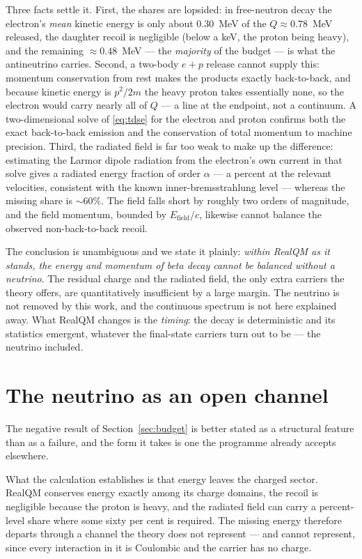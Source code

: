 \documentclass[11pt]{article}
\begin{document}
Three facts settle it. First, the shares are lopsided: in free-neutron decay the electron's \emph{mean}
kinetic energy is only about $0.30$~MeV of the $Q\approx0.78$~MeV released, the daughter recoil is
negligible (below a keV, the proton being heavy), and the remaining $\approx0.48$~MeV --- the
\emph{majority} of the budget --- is what the antineutrino carries. Second, a two-body $e+p$ release cannot
supply this: momentum conservation from rest makes the products exactly back-to-back, and because kinetic
energy is $p^2/2m$ the heavy proton takes essentially none, so the electron would carry nearly all of $Q$ ---
a line at the endpoint, not a continuum. A two-dimensional solve of \eqref{eq:tdse} for the electron and
proton confirms both the exact back-to-back emission and the conservation of total momentum to machine
precision. Third, the radiated field is far too weak to make up the difference: estimating the Larmor
dipole radiation from the electron's own current in that solve gives a radiated energy fraction of order
$\alpha$ --- a percent at the relevant velocities, consistent with the known inner-bremsstrahlung level ---
whereas the missing share is $\sim60\%$. The field falls short by roughly two orders of magnitude, and the
field momentum, bounded by $E_{\text{field}}/c$, likewise cannot balance the observed non-back-to-back
recoil.

The conclusion is unambiguous and we state it plainly: \emph{within RealQM as it stands, the energy and
momentum of beta decay cannot be balanced without a neutrino}. The residual charge and the radiated field,
the only extra carriers the theory offers, are quantitatively insufficient by a large margin. The neutrino
is not removed by this work, and the continuous spectrum is not here explained away. What RealQM changes is
the \emph{timing}: the decay is deterministic and its statistics emergent, whatever the final-state carriers
turn out to be --- the neutrino included.

\section{The neutrino as an open channel}
\label{sec:channel}

The negative result of Section~\ref{sec:budget} is better stated as a structural feature than as a failure,
and the form it takes is one the programme already accepts elsewhere.

What the calculation establishes is that energy leaves the charged sector. RealQM conserves energy exactly
among its charge domains, the recoil is negligible because the proton is heavy, and the radiated field can
carry a percent-level share where some sixty per cent is required. The missing energy therefore departs
through a channel the theory does not represent --- and cannot represent, since every interaction in it is
Coulombic and the carrier has no charge.
\end{document}
